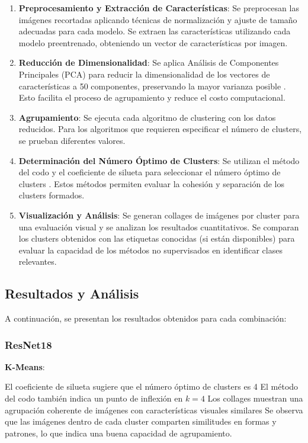 \begin{enumerate}
    \item \textbf{Preprocesamiento y Extracción de Características}: Se preprocesan las imágenes recortadas aplicando técnicas de normalización y ajuste de tamaño adecuadas para cada modelo.
    Se extraen las características utilizando cada modelo preentrenado, obteniendo un vector de características por imagen.
    \item \textbf{Reducción de Dimensionalidad}: Se aplica Análisis de Componentes Principales (PCA) para reducir la dimensionalidad de los vectores de características a 50 componentes, preservando la mayor varianza posible \cite{jolliffe2016principal}.
    Esto facilita el proceso de agrupamiento y reduce el costo computacional.
    \item \textbf{Agrupamiento}: Se ejecuta cada algoritmo de clustering con los datos reducidos.
    Para los algoritmos que requieren especificar el número de clusters, se prueban diferentes valores.
    \item \textbf{Determinación del Número Óptimo de Clusters}: Se utilizan el método del codo y el coeficiente de silueta para seleccionar el número óptimo de clusters \cite{rousseeuw1987silhouettes}.
    Estos métodos permiten evaluar la cohesión y separación de los clusters formados.
    \item \textbf{Visualización y Análisis}: Se generan collages de imágenes por cluster para una evaluación visual y se analizan los resultados cuantitativos.
    Se comparan los clusters obtenidos con las etiquetas conocidas (si están disponibles) para evaluar la capacidad de los métodos no supervisados en identificar clases relevantes.
\end{enumerate}

\subsection{Resultados y Análisis}

A continuación, se presentan los resultados obtenidos para cada combinación:

\subsubsection{ResNet18}

\textbf{K-Means}:

El coeficiente de silueta sugiere que el número óptimo de clusters es 4 %
El método del codo también indica un punto de inflexión en $k=4$ %
Los collages muestran una agrupación coherente de imágenes con características visuales similares %
Se observa que las imágenes dentro de cada cluster comparten similitudes en formas y patrones, lo que indica una buena capacidad de agrupamiento.

